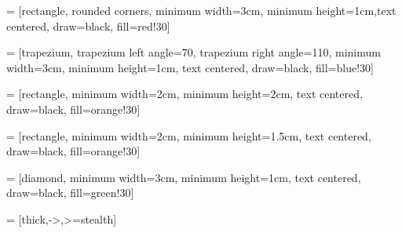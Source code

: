 
\usepackage{calc}
\usepackage{booktabs}

\usepackage[T1]{fontenc}
\usepackage{graphicx}
\usepackage{xcolor}
\usepackage{xspace}
\usepackage{comment}
\usepackage{float}
\usepackage{amssymb, amsmath}
\usepackage{kbordermatrix}
\usepackage{tikz}
\usepackage{lipsum}
\usepackage{listings}
\usepackage{minted}
\usepackage{comment}
\usepackage{wrapfig}
\usepackage{hyperref}
\usepackage{ragged2e}

\usepackage[backend=biber,style=numeric, sorting=none]{biblatex}


\usetikzlibrary{arrows, calc, matrix, positioning, shapes.geometric}

\def\name{Elixxir\xspace}

\newcommand{\rn}[2]{%
    \tikz[remember picture,baseline=(#1.base)]\node [inner sep=0] (#1) {$#2$};%
}
\renewcommand{\kbldelim}{[}%
\renewcommand{\kbrdelim}{]}%



 = [rectangle, rounded corners, minimum width=3cm, minimum height=1cm,text centered, draw=black, fill=red!30]

 = [trapezium, trapezium left angle=70, trapezium right angle=110, minimum width=3cm, minimum height=1cm, text centered, draw=black, fill=blue!30]

 = [rectangle, minimum width=2cm, minimum height=2cm, text centered, draw=black, fill=orange!30]

 = [rectangle, minimum width=2cm, minimum height=1.5cm, text centered, draw=black, fill=orange!30]

 = [diamond, minimum width=3cm, minimum height=1cm, text centered, draw=black, fill=green!30]

 = [thick,->,>=stealth]




\usepackage{fontspec}
\setmainfont
[ExternalLocation=fonts/,
BoldFont=Lato-Bold.ttf,
ItalicFont=Lato-Italic.ttf,
BoldItalicFont=Lato-BoldItalic.ttf]
{Lato-Regular.ttf}
\newfontfamily{}

